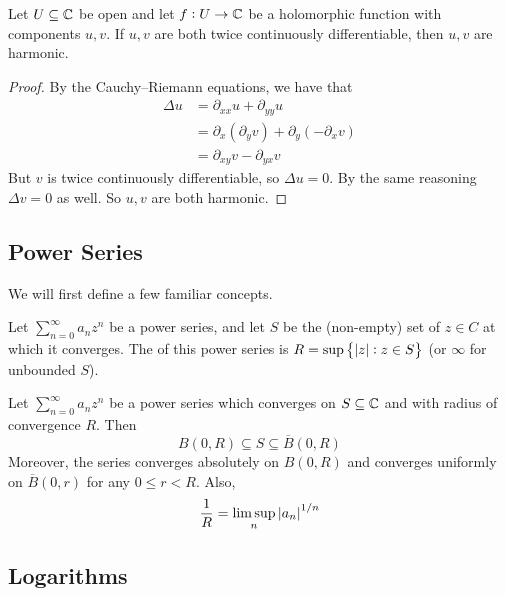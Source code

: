 \documentclass{styles/tufte}
\begin{document}
  \begin{theorem}{}{}
    Let $U \subseteq \mathbb{C}$ be open and let $f: U \to \mathbb{C}$ be a holomorphic function with components $u, v$. If $u, v$ are both twice continuously differentiable, then $u, v$ are harmonic.
  \end{theorem}
  \begin{proof}
    By the Cauchy--Riemann equations, we have that
    \begin{align*}
      \Delta u
      &= \partial_{xx} u + \partial_{yy} u \\
      &= \partial_x (\partial_y v) + \partial_y (-\partial_x v) \\
      &= \partial_{xy} v - \partial_{yx} v
    \end{align*}
    But $v$ is twice continuously differentiable, so $\Delta u = 0$. By the same reasoning $\Delta v = 0$ as well. So $u, v$ are both harmonic.
  \end{proof}


\subsection{Power Series}
  We will first define a few familiar concepts.
  
  \begin{definition}{}{}
    Let $\sum_{n=0}^\infty a_n z^n$ be a power series, and let $S$ be the (non-empty) set of $z \in C$ at which it converges. The  of this power series is $R = \sup\set{\abs{z}: z \in S}$ (or $\infty$ for unbounded $S$).
  \end{definition}
  
  \begin{proposition}{}{}
    Let $\sum_{n=0}^\infty a_n z^n$ be a power series which converges on $S \subseteq \mathbb{C}$ and with radius of convergence $R$. Then
    \[ B(0, R) \subseteq S \subseteq \overline{B}(0, R) \]
    Moreover, the series converges absolutely on $B(0, R)$ and converges uniformly on $\overline{B}(0, r)$ for any $0 \leqslant r < R$. Also,
    \[ \frac{1}{R} = \limsup_n \abs{a_n}^{1/n} \]
  \end{proposition}


\subsection{Logarithms}
  
\end{document}
